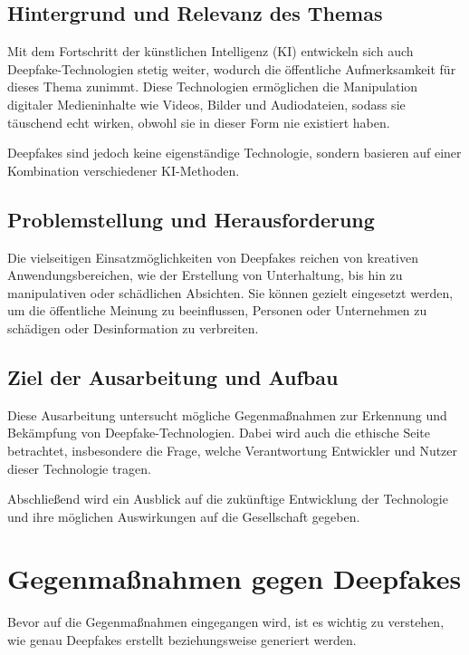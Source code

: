 \documentclass[a4paper,12pt]{article}
\begin{document}
\subsection{Hintergrund und Relevanz des Themas}

Mit dem Fortschritt der künstlichen Intelligenz (KI) entwickeln sich auch Deepfake-Technologien stetig weiter, wodurch die öffentliche Aufmerksamkeit für dieses Thema zunimmt. 
Diese Technologien ermöglichen die Manipulation digitaler Medieninhalte wie Videos, Bilder und Audiodateien, sodass sie täuschend echt wirken, obwohl sie in dieser Form nie existiert haben.

Deepfakes sind jedoch keine eigenständige Technologie, sondern basieren auf einer Kombination verschiedener KI-Methoden. \cite{BVDW2024}\\

\subsection{Problemstellung und Herausforderung}
Die vielseitigen Einsatzmöglichkeiten von Deepfakes reichen von kreativen Anwendungsbereichen, wie der Erstellung von Unterhaltung, bis hin zu manipulativen oder schädlichen Absichten. 
Sie können gezielt eingesetzt werden, um die öffentliche Meinung zu beeinflussen, Personen oder Unternehmen zu schädigen oder Desinformation zu verbreiten. \cite{CounterExtremism2020}\\

\subsection{Ziel der Ausarbeitung und Aufbau}
Diese Ausarbeitung untersucht mögliche Gegenmaßnahmen zur Erkennung und Bekämpfung von Deepfake-Technologien. 
Dabei wird auch die ethische Seite betrachtet, insbesondere die Frage, welche Verantwortung Entwickler und Nutzer dieser Technologie tragen.  

Abschließend wird ein Ausblick auf die zukünftige Entwicklung der Technologie und ihre möglichen Auswirkungen auf die Gesellschaft gegeben.
\newpage

\section{Gegenmaßnahmen gegen Deepfakes}
Bevor auf die Gegenmaßnahmen eingegangen wird, ist es wichtig zu verstehen, wie genau Deepfakes erstellt beziehungsweise generiert werden.
\end{document}
